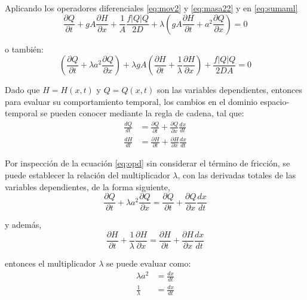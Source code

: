 \documentclass[letterpaper]{report}
\begin{document}
Aplicando los operadores diferenciales \ref{eq:mov2} y \ref{eq:masa22} y en \ref{eq:sumaml}
\begin{equation}
	\frac{\partial Q}{\partial t}+gA\frac{\partial H}{\partial x}+\frac{1}{A}\frac{f\left|Q\right|Q}{2D}+\lambda\left(gA\frac{\partial H}{\partial t}+a^2\frac{\partial Q}{\partial x}\right)=0
\end{equation}

o también:
\begin{equation}
	\left(\frac{\partial Q}{\partial t}+\lambda a^2\frac{\partial Q}{\partial x}\right)+\lambda gA\left(\frac{\partial H}{\partial t}+\frac{1}{\lambda}\frac{\partial H}{\partial x}\right)+\frac{f\left|Q\right|Q}{2DA}=0
\label{eq:opd}
\end{equation}

Dado que $H=H(x,t)$ y $Q=Q(x,t)$ son las variables dependientes, entonces para evaluar su comportamiento temporal, los cambios en el dominio espacio-temporal se pueden conocer mediante la regla de cadena, tal que:
\begin{align}
	\frac{dQ}{dt}&=\frac{\partial Q}{\partial t}+\frac{\partial Q}{\partial x}\frac{dx}{dt}\\
	\frac{dH}{dt}&=\frac{\partial H}{\partial t}+\frac{\partial H}{\partial x}\frac{dx}{dt}
\end{align}

Por inspección de la ecuación \ref{eq:opd} sin considerar el término de fricción, se puede establecer la relación del multiplicador $\lambda$, con las derivadas totales de las variables dependientes, de la forma siguiente,
\begin{equation}
	\frac{\partial Q}{\partial t}+\lambda a^2\frac{\partial Q}{\partial x}=\frac{\partial Q}{\partial t}+\frac{\partial Q}{\partial x}\frac{dx}{dt}
\label{eq:par3}
\end{equation}

y además,
\begin{equation}
	\frac{\partial H}{\partial t}+\frac{1}{\lambda}\frac{\partial H}{\partial x}=\frac{\partial H}{\partial t}+\frac{\partial H}{\partial x}\frac{dx}{dt}
\label{eq:par4}
\end{equation}

entonces el multiplicador $\lambda$ se puede evaluar como:
\begin{equation}
	\begin{aligned}
		\lambda a^2 &=\frac{dx}{dt}\\
		\frac{1}{\lambda} &=\frac{dx}{dt}
	\end{aligned}
\end{equation}
\end{document}
